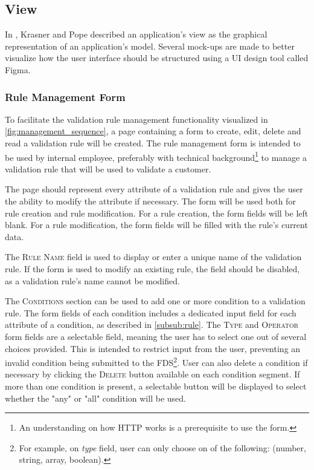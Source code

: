 \subsection{View}
  \label{sub:design_view}

In \autocite{krasner-pope-88}, Krasner and Pope described an application's view as the graphical representation of an application's model. Several mock-ups are made to better visualize how the user interface should be structured using a UI design tool called Figma.  


\subsubsection{Rule Management Form}

To facilitate the validation rule management functionality visualized in \autoref{fig:management_sequence}, a page containing a form to create, edit, delete and read a validation rule will be created. The rule management form is intended to be used by internal employee, preferably with technical background\footnote{An understanding on how HTTP works is a prerequisite to use the form.} to manage a validation rule that will be used to validate a customer.

The page should represent every attribute of a validation rule and gives the user the ability to modify the attribute if necessary. The form will be used both for rule creation and rule modification. For a rule creation, the form fields will be left blank. For a rule modification, the form fields will be filled with the rule's current data. 

The \textsc{Rule Name} field is used to display or enter a unique name of the validation rule. If the form is used to modify an existing rule, the field should be disabled, as a validation rule's name cannot be modified. 

The \textsc{Conditions} section can be used to add one or more condition to a validation rule. The form fields of each condition includes a dedicated input field for each attribute of a condition, as described in \autoref{subsub:rule}. The \textsc{Type} and \textsc{Operator} form fields are a selectable field, meaning the user has to select one out of several choices provided. This is intended to restrict input from the user, preventing an invalid condition being submitted to the FDS\footnote{For example, on \emph{type} field, user can only choose on of the following: (number, string, array, boolean).}. User can also delete a condition if necessary by clicking the \textsc{Delete} button available on each condition segment. If more than one condition is present, a selectable button will be displayed to select whether the "any" or "all" condition will be used. 

